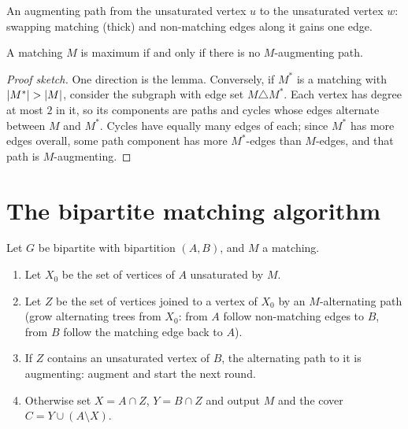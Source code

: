 \begin{center}
\end{center}
An augmenting path from the unsaturated vertex $u$ to the unsaturated vertex $w$: swapping
matching (thick) and non-matching edges along it gains one edge.

\begin{theorem}[Berge]
A matching $M$ is maximum if and only if there is no $M$-augmenting path.
\end{theorem}
\begin{proof}[Proof sketch]
One direction is the lemma. Conversely, if $M^*$ is a matching with $\left\lvert M^* \right\rvert > \left\lvert M \right\rvert$, consider
the subgraph with edge set $M \triangle M^*$. Each vertex has degree at most $2$ in it, so its
components are paths and cycles whose edges alternate between $M$ and $M^*$. Cycles have equally
many edges of each; since $M^*$ has more edges overall, some path component has more $M^*$-edges
than $M$-edges, and that path is $M$-augmenting.
\end{proof}

\section{The bipartite matching algorithm}

Let $G$ be bipartite with bipartition $(A,B)$, and $M$ a matching.
\begin{important}
\begin{enumerate}
  \item Let $X_0$ be the set of vertices of $A$ unsaturated by $M$.
  \item Let $Z$ be the set of vertices joined to a vertex of $X_0$ by an $M$-alternating path
        (grow alternating trees from $X_0$: from $A$ follow non-matching edges to $B$, from $B$
        follow the matching edge back to $A$).
  \item If $Z$ contains an unsaturated vertex of $B$, the alternating path to it is augmenting:
        augment and start the next round.
  \item Otherwise set $X = A\cap Z$, $Y = B\cap Z$ and output $M$ and the cover
        $C = Y \cup (A \setminus X)$.
\end{enumerate}
\end{important}

